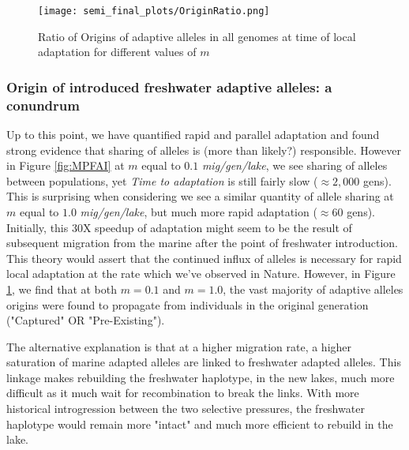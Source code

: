 \documentclass{article}
\begin{document}
\begin{figure}
	\begin{center}
  		\texttt{[image: semi\_final\_plots/OriginRatio.png]}
  		\caption{ 
		Ratio of Origins of adaptive alleles in all genomes at time of local adaptation for different values of $m$
		}
  		\label{fig:Origin}
	\end{center}
\end{figure}


\subsubsection*{Origin of introduced freshwater adaptive alleles: a conundrum}
Up to this point, we have quantified rapid and parallel adaptation and found strong evidence that sharing of alleles is (more than likely?) responsible.
However in Figure \ref{fig:MPFAI} at $m$ equal to $0.1$ \emph{mig/gen/lake}, we see sharing of alleles between populations,
yet \emph{Time to adaptation} is still fairly slow ($\approx 2,000$ gens).
This is surprising when considering we see a similar quantity of allele sharing at  $m$ equal to $1.0$ \emph{mig/gen/lake}, 
but much more rapid adaptation ($\approx 60$ gens). 
Initially, this 30X speedup of adaptation might seem to be the result of subsequent migration from the marine after the point of freshwater introduction. 
This theory would assert that the continued influx of alleles is necessary for rapid local adaptation at the rate which we've observed in Nature.
However, in Figure \ref{fig:Origin}, we find that at both $m = 0.1$ and $m = 1.0$, the vast majority of adaptive alleles origins were found to propagate 
from individuals in the original generation ("Captured" OR "Pre-Existing").

The alternative explanation is that at a higher migration rate, a higher saturation of marine adapted alleles are linked to freshwater adapted alleles.
This linkage makes rebuilding the freshwater haplotype, in the new lakes, much more difficult as it much wait for recombination to break the links.
With more historical introgression between the two selective pressures, the freshwater haplotype would remain more "intact" and much more efficient
to rebuild in the lake.
\end{document}
